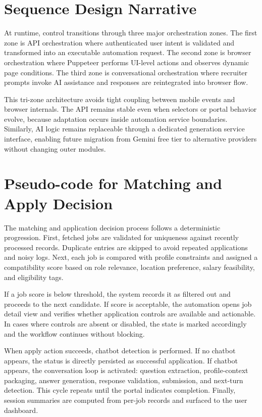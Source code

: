 \documentclass[12pt,a4paper,oneside]{report}
\begin{document}
\section{Sequence Design Narrative}
At runtime, control transitions through three major orchestration zones. The first zone is API orchestration where authenticated user intent is validated and transformed into an executable automation request. The second zone is browser orchestration where Puppeteer performs UI-level actions and observes dynamic page conditions. The third zone is conversational orchestration where recruiter prompts invoke AI assistance and responses are reintegrated into browser flow.

This tri-zone architecture avoids tight coupling between mobile events and browser internals. The API remains stable even when selectors or portal behavior evolve, because adaptation occurs inside automation service boundaries. Similarly, AI logic remains replaceable through a dedicated generation service interface, enabling future migration from Gemini free tier to alternative providers without changing outer modules.

\section{Pseudo-code for Matching and Apply Decision}
The matching and application decision process follows a deterministic progression. First, fetched jobs are validated for uniqueness against recently processed records. Duplicate entries are skipped to avoid repeated applications and noisy logs. Next, each job is compared with profile constraints and assigned a compatibility score based on role relevance, location preference, salary feasibility, and eligibility tags.

If a job score is below threshold, the system records it as filtered out and proceeds to the next candidate. If score is acceptable, the automation opens job detail view and verifies whether application controls are available and actionable. In cases where controls are absent or disabled, the state is marked accordingly and the workflow continues without blocking.

When apply action succeeds, chatbot detection is performed. If no chatbot appears, the status is directly persisted as successful application. If chatbot appears, the conversation loop is activated: question extraction, profile-context packaging, answer generation, response validation, submission, and next-turn detection. This cycle repeats until the portal indicates completion. Finally, session summaries are computed from per-job records and surfaced to the user dashboard.
\end{document}
